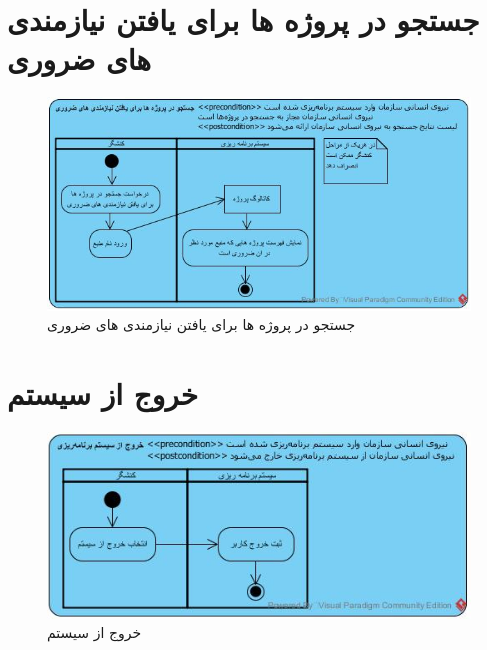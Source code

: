 \section{جستجو در پروژه ها برای یافتن نیازمندی های ضروری}
\begin{figure}[H]
	\centering
	\includegraphics[scale=0.7]{img/activity/SearchForEssentialRequirements}
	\caption{جستجو در پروژه ها برای یافتن نیازمندی های ضروری}
\end{figure}


\section{خروج از سیستم}
\begin{figure}[H]
	\centering
	\includegraphics[scale=0.8]{img/activity/SignOut}
	\caption{خروج از سیستم}
\end{figure}


